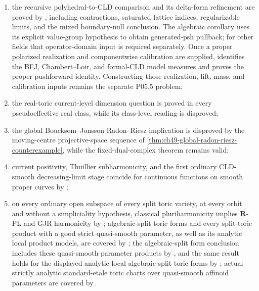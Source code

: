 \begin{enumerate}
\item the recursive polyhedral-to-CLD comparison and its delta-form
      refinement are proved by
      , including contractions,
      saturated lattice indices, regularizable limits, and the mixed
      boundary-null conclusion.  The algebraic corollary uses its explicit
      value-group hypothesis to obtain generated-psh pullback; for other
      fields that operator-domain input is required separately.  Once a proper polarized realization and
      componentwise calibration are supplied,
       identifies the BFJ,
      Chambert--Loir, and formal-CLD model measures and proves the proper
      pushforward identity.  Constructing those realization, lift, mass, and
      calibration inputs remains the separate P05.5 problem;
\item the real-toric current-level dimension question is proved in every
      pseudoeffective real class, while its class-level reading is
      disproved;
\item the global Boucksom--Jonsson Radon--Riesz implication is disproved by
      the moving-centre projective-space sequence of
      \cref{thm:ch49-global-radon-riesz-counterexample}, while the
      fixed-dual-complex theorem remains valid;
\item current positivity, Thuillier subharmonicity, and the first ordinary
      CLD-smooth decreasing-limit stage coincide for continuous functions on
      smooth proper curves by
      ;
\item on every ordinary open subspace of every split toric variety, at every
      orbit and without a simpliciality hypothesis, classical
      pluriharmonicity implies \(\mathbf R\)-PL and GJR harmonicity by
      ; algebraic-split toric forms and
      every split-toric product with a good strict quasi-smooth parameter,
      as well as its analytic local product models, are covered by
      ; the algebraic-split
      form conclusion includes these quasi-smooth-parameter products by
      , and the same result holds
      for the displayed analytic-local algebraic-split toric forms by
      ; actual strictly analytic standard-etale
      toric charts over quasi-smooth affinoid parameters are covered by

\end{enumerate}
